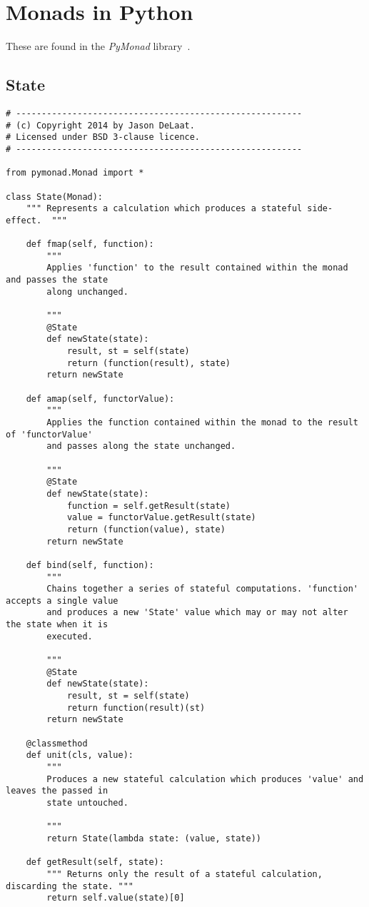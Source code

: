 \chapter{Monads in Python}\label{app:monadspython}
These are found in the \emph{PyMonad} library~\cite{pymonadlibrary}.

\section{State}
\begin{lstlisting}
# --------------------------------------------------------
# (c) Copyright 2014 by Jason DeLaat.
# Licensed under BSD 3-clause licence.
# --------------------------------------------------------

from pymonad.Monad import *

class State(Monad):
	""" Represents a calculation which produces a stateful side-effect.  """

	def fmap(self, function):
		"""
		Applies 'function' to the result contained within the monad and passes the state
		along unchanged.

		"""
		@State
		def newState(state):
			result, st = self(state)
			return (function(result), state)
		return newState

	def amap(self, functorValue):
		"""
		Applies the function contained within the monad to the result of 'functorValue'
		and passes along the state unchanged.

		"""
		@State
		def newState(state):
			function = self.getResult(state)
			value = functorValue.getResult(state)
			return (function(value), state)
		return newState

	def bind(self, function):
		"""
		Chains together a series of stateful computations. 'function' accepts a single value
		and produces a new 'State' value which may or may not alter the state when it is
		executed.

		"""
		@State
		def newState(state):
			result, st = self(state)
			return function(result)(st)
		return newState

	@classmethod
	def unit(cls, value):
		"""
		Produces a new stateful calculation which produces 'value' and leaves the passed in
		state untouched.

		"""
		return State(lambda state: (value, state))

	def getResult(self, state):
		""" Returns only the result of a stateful calculation, discarding the state. """
		return self.value(state)[0]


\end{lstlisting}
